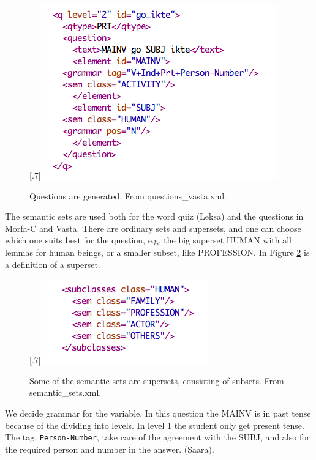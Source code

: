 \documentclass[a4paper,12pt]{article}
\begin{document}
\begin{figure}[htbp]
\begin{center}
\scalebox{.7}[.7]{\includegraphics{img/question_vasta.png}}\\
\caption{Questions are generated. From questions\_vasta.xml.}
\label{questionv}
\end{center}
\end{figure}

The semantic sets are used both for the word quiz (Leksa) and the questions in Morfa-C and Vasta. There are ordinary sets and supersets, and one can choose which one suits best for the question, e.g. the big superset HUMAN with all lemmas for human beings, or a smaller subset, like PROFESSION. In Figure \ref{semset} is a definition of a superset. 

\begin{figure}[htbp]
\begin{center}
\scalebox{.7}[.7]{\includegraphics{img/semantic_set.png}}\\
\caption{Some of the semantic sets are supersets, consisting of subsets. From semantic\_sets.xml.}
\label{semset}
\end{center}
\end{figure}

We decide grammar for the variable. In this question the MAINV is in past tense because of the dividing into levels. In level 1 the student only get present tense. The tag, \texttt{Person-Number}, take care of the agreement with the SUBJ, and also for the required person and number in the answer. (Saara).
\end{document}
